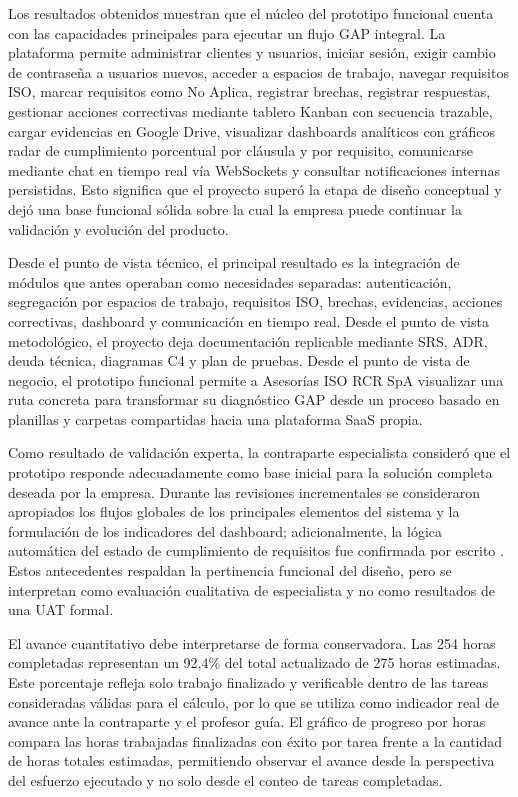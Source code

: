 \documentclass[final]{udpthesis}
\begin{document}
Los resultados obtenidos muestran que el núcleo del prototipo funcional cuenta con las capacidades principales para ejecutar un flujo GAP integral. La plataforma permite administrar clientes y usuarios, iniciar sesión, exigir cambio de contraseña a usuarios nuevos, acceder a espacios de trabajo, navegar requisitos ISO, marcar requisitos como No Aplica, registrar brechas, registrar respuestas, gestionar acciones correctivas mediante tablero Kanban con secuencia trazable, cargar evidencias en Google Drive, visualizar dashboards analíticos con gráficos radar de cumplimiento porcentual por cláusula y por requisito, comunicarse mediante chat en tiempo real vía WebSockets y consultar notificaciones internas persistidas. Esto significa que el proyecto superó la etapa de diseño conceptual y dejó una base funcional sólida sobre la cual la empresa puede continuar la validación y evolución del producto.

Desde el punto de vista técnico, el principal resultado es la integración de módulos que antes operaban como necesidades separadas: autenticación, segregación por espacios de trabajo, requisitos ISO, brechas, evidencias, acciones correctivas, dashboard y comunicación en tiempo real. Desde el punto de vista metodológico, el proyecto deja documentación replicable mediante SRS, ADR, deuda técnica, diagramas C4 y plan de pruebas. Desde el punto de vista de negocio, el prototipo funcional permite a Asesorías ISO RCR SpA visualizar una ruta concreta para transformar su diagnóstico GAP desde un proceso basado en planillas y carpetas compartidas hacia una plataforma SaaS propia.

Como resultado de validación experta, la contraparte especialista consideró que el prototipo responde adecuadamente como base inicial para la solución completa deseada por la empresa. Durante las revisiones incrementales se consideraron apropiados los flujos globales de los principales elementos del sistema y la formulación de los indicadores del dashboard; adicionalmente, la lógica automática del estado de cumplimiento de requisitos fue confirmada por escrito \cite{entrevista-whatsapp-maria}. Estos antecedentes respaldan la pertinencia funcional del diseño, pero se interpretan como evaluación cualitativa de especialista y no como resultados de una UAT formal.

El avance cuantitativo debe interpretarse de forma conservadora. Las 254 horas completadas representan un 92,4\% del total actualizado de 275 horas estimadas. Este porcentaje refleja solo trabajo finalizado y verificable dentro de las tareas consideradas válidas para el cálculo, por lo que se utiliza como indicador real de avance ante la contraparte y el profesor guía. El gráfico de progreso por horas compara las horas trabajadas finalizadas con éxito por tarea frente a la cantidad de horas totales estimadas, permitiendo observar el avance desde la perspectiva del esfuerzo ejecutado y no solo desde el conteo de tareas completadas.
\end{document}
